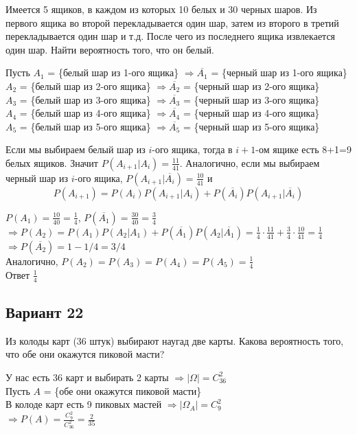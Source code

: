\begin{exercise}[5] Имеется  5 ящиков, в каждом из которых   10  белых  и  30  черных шаров. Из первого ящика во второй перекладывается один шар, затем из второго в третий перекладывается один шар  и т.д. После чего из последнего ящика извлекается один шар. Найти вероятность того, что он белый.

Пусть $A_1$ = \{белый шар из 1-ого ящика\} $\Rightarrow \overline{A_1}$ = \{черный шар из 1-ого ящика\} \\ $A_2$ = \{белый шар из 2-ого ящика\} $\Rightarrow \overline{A_2}$ = \{черный шар из 2-ого ящика\} \\ $A_3$ = \{белый шар из 3-ого ящика\} $\Rightarrow \overline{A_3}$ = \{черный шар из 3-ого ящика\} \\ $A_4$ = \{белый шар из 4-ого ящика\} $\Rightarrow \overline{A_4}$ = \{черный шар из 4-ого ящика\} \\ $A_5$ = \{белый шар из 5-ого ящика\} $\Rightarrow \overline{A_5}$ = \{черный шар из 5-ого ящика\}

Если мы выбираем белый шар из $i$-ого ящика, тогда в $i+1$-ом ящике есть 8+1=9 белых ящиков. Значит $P(A_{i+1} | A_i) = \frac{11}{41}$. Аналогично, если мы выбираем черный шар из $i$-ого ящика, $P(A_{i+1} | \overline{A_i}) = \frac{10}{41}$ и $$P(A_{i+1}) = P(A_i) P(A_{i+1} | A_i) + P(\overline{A_i}) P(A_{i+1} | \overline{A_i})$$ 

$P(A_1) = \frac{10}{40} = \frac{1}{4}$, $P(\overline{A_1}) = \frac{30}{40} = \frac{3}{4}$ \\ $\Rightarrow P(A_2) = P(A_1) P(A_2 | A_1) + P(\overline{A_1}) P(A_2 | \overline{A_1}) = \frac{1}{4} \cdot \frac{11}{41} + \frac{3}{4} \cdot \frac{10}{41} = \frac{1}{4}$ \\ $\Rightarrow P(\overline{A_2}) = 1-1/4=3/4$ \\ Аналогично, $P(A_2) = P(A_3) = P(A_4) = P(A_5) = \frac{1}{4}$ \\ Ответ $\frac{1}{4}$
\end{exercise}

\subsection*{Вариант 22}
\begin{exercise}[1] Из колоды карт (36 штук) выбирают наугад две карты. Какова вероятность того, что обе они окажутся пиковой масти?
	
	У нас есть 36 карт и выбирать 2 карты $\Rightarrow | \Omega | = C^2_{36}$ \\ Пусть $A$ = \{обе они окажутся пиковой масти\} \\ В колоде карт есть 9 пиковых мастей $\Rightarrow | \Omega_A | = C^2_9$ \\ $\Rightarrow P(A) = \frac{C^2_9}{C^2_{36}} = \frac{2}{35}$
\end{exercise}

